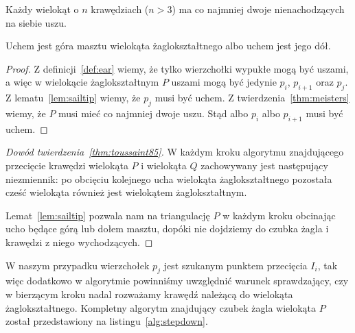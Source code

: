\begin{twierdzenie} Każdy wielokąt o
  $n$ krawędziach ($n > 3$) ma co najmniej dwoje nienachodzących na
  siebie uszu.
\end{twierdzenie}

\begin{lemat}\label{lem:sailmast}\emph{\cite{ToussaintInt}}
  Uchem jest góra masztu wielokąta żaglokształtnego albo uchem jest
  jego dół.
\end{lemat}

\begin{proof}
  Z definicji~\ref{def:ear} wiemy, że tylko wierzchołki wypukłe mogą
  być uszami, a więc w wielokącie żaglokształtnym $P$ uszami mogą być
  jedynie $p_i$, $p_{i+1}$ oraz $p_j$. Z lematu~\ref{lem:sailtip}
  wiemy, że $p_j$ musi być uchem. Z twierdzenia~\ref{thm:meisters}
  wiemy, że $P$ musi mieć co najmniej dwoje uszu. Stąd albo $p_i$ albo
  $p_{i+1}$ musi być uchem.
\end{proof}

\begin{proof}[Dowód twierdzenia~\ref{thm:toussaint85}]
  W każdym kroku algorytmu znajdującego przecięcie krawędzi wielokąta
  $P$ i wielokąta $Q$ zachowywany jest następujący niezmiennik: po
  obcięciu kolejnego ucha wielokąta żaglokształtnego pozostała cześć
  wielokąta również jest wielokątem żaglokształtnym.

  Lemat~\ref{lem:sailtip} pozwala nam na triangulację $P$ w każdym
  kroku obcinając ucho będące górą lub dołem masztu, dopóki nie
  dojdziemy do czubka żagla i krawędzi z niego wychodzących.
\end{proof}

W naszym przypadku wierzchołek $p_j$ jest szukanym punktem przecięcia
$I_i$, tak więc dodatkowo w algorytmie powinniśmy uwzględnić warunek
sprawdzający, czy w bierzącym kroku nadal rozważamy krawędź należącą
do wielokąta żaglokształtnego. Kompletny algorytm znajdujący czubek
żagla wielokąta $P$ został przedstawiony na
listingu~\ref{alg:stepdown}.

